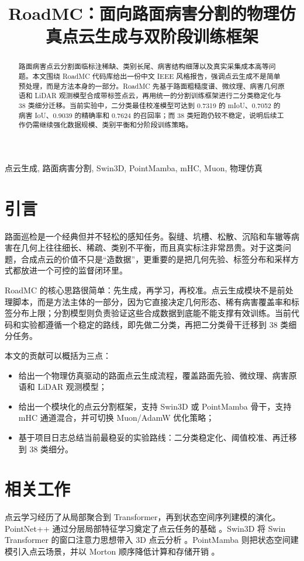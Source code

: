 \documentclass[conference]{IEEEtran}
\title{RoadMC：面向路面病害分割的物理仿真点云生成与双阶段训练框架}
\author{\IEEEauthorblockN{YQGHL}
\IEEEauthorblockA{RoadMC repository snapshot\\
\texttt{https://github.com/YQGHL/roadmc}}}
\begin{document}
\maketitle

\begin{abstract}
路面病害点云分割面临标注稀缺、类别长尾、病害结构细薄以及真实采集成本高等问题。本文围绕 RoadMC 代码库给出一份中文 IEEE 风格报告，强调点云生成不是简单预处理，而是方法本身的一部分。RoadMC 先基于路面粗糙度谱、微纹理、病害几何原语和 LiDAR 观测模型合成带标签点云，再用统一的分割训练框架进行二分类稳定化与 38 类细分迁移。当前实验中，二分类最佳校准模型可达到 0.7319 的 mIoU、0.7052 的病害 IoU、0.9039 的精确率和 0.7624 的召回率；而 38 类短跑仍较不稳定，说明后续工作仍需继续强化数据规模、类别平衡和分阶段训练策略。
\end{abstract}

\begin{IEEEkeywords}
点云生成, 路面病害分割, Swin3D, PointMamba, mHC, Muon, 物理仿真
\end{IEEEkeywords}

\section{引言}
路面巡检是一个经典但并不轻松的感知任务。裂缝、坑槽、松散、沉陷和车辙等病害在几何上往往细长、稀疏、类别不平衡，而且真实标注非常昂贵。对于这类问题，合成点云的价值不只是“造数据”，更重要的是把几何先验、标签分布和采样方式都放进一个可控的监督闭环里。

RoadMC 的核心思路很简单：先生成，再学习，再校准。点云生成模块不是前处理脚本，而是方法主体的一部分，因为它直接决定几何形态、稀有病害覆盖率和标签分布上限；分割模型则负责验证这些合成数据到底能不能支撑有效训练。当前代码和实验都遵循一个稳定的路线，即先做二分类，再把二分类骨干迁移到 38 类细分任务。

本文的贡献可以概括为三点：
\begin{itemize}
  \item 给出一个物理仿真驱动的路面点云生成流程，覆盖路面先验、微纹理、病害原语和 LiDAR 观测模型；
  \item 给出一个模块化的点云分割框架，支持 Swin3D 或 PointMamba 骨干，支持 mHC 通道混合，并可切换 Muon/AdamW 优化策略；
  \item 基于项目日志总结当前最稳妥的实验路线：二分类稳定化、阈值校准、再迁移到 38 类细分。
\end{itemize}

\section{相关工作}
点云学习经历了从局部聚合到 Transformer，再到状态空间序列建模的演化。PointNet++ 通过分层局部特征学习奠定了点云任务的基础 \cite{pointnetpp}。Swin3D 将 Swin Transformer 的窗口注意力思想带入 3D 点云分析 \cite{swin3d}。PointMamba 则把状态空间建模引入点云场景，并以 Morton 顺序降低计算和存储开销 \cite{pointmamba}。
\end{document}
